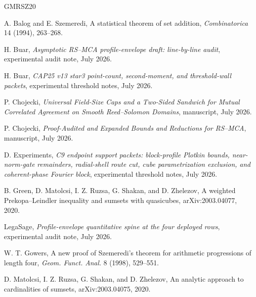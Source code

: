 \documentclass[11pt,a4paper]{amsart}
\numberwithin{equation}{section}
\theoremstyle{remark}
\begin{document}
\enlargethispage{4\baselineskip}
\begin{thebibliography}{GMRSZ20}

A. Balog and E. Szemeredi,
\newblock A statistical theorem of set addition,
\newblock \emph{Combinatorica} 14 (1994), 263--268.

H. Buar,
\newblock \emph{Asymptotic RS--MCA profile-envelope draft:
line-by-line audit},
\newblock experimental audit note, July 2026.

H. Buar,
\newblock \emph{CAP25 v13 star3 point-count, second-moment, and
threshold-wall packets},
\newblock experimental threshold notes, July 2026.

P. Chojecki,
\newblock \emph{Universal Field-Size Caps and a Two-Sided Sandwich for
Mutual Correlated Agreement on Smooth Reed--Solomon Domains},
\newblock manuscript, July 2026.

P. Chojecki,
\newblock \emph{Proof-Audited and Expanded Bounds and Reductions for
RS--MCA},
\newblock manuscript, July 2026.

D. Experiments,
\newblock \emph{C9 endpoint support packets: block-profile Plotkin bounds,
near-norm-gate remainders, radial-shell route cut, cube parametrization
exclusion, and coherent-phase Fourier block},
\newblock experimental threshold notes, July 2026.

B. Green, D. Matolcsi, I. Z. Ruzsa, G. Shakan, and D. Zhelezov,
\newblock A weighted Prekopa--Leindler inequality and sumsets with quasicubes,
\newblock arXiv:2003.04077, 2020.

LegaSage,
\newblock \emph{Profile-envelope quantitative spine at the four deployed
rows},
\newblock experimental audit note, July 2026.

W. T. Gowers,
\newblock A new proof of Szemeredi's theorem for arithmetic progressions of length four,
\newblock \emph{Geom. Funct. Anal.} 8 (1998), 529--551.

D. Matolcsi, I. Z. Ruzsa, G. Shakan, and D. Zhelezov,
\newblock An analytic approach to cardinalities of sumsets,
\newblock arXiv:2003.04075, 2020.

\end{thebibliography}
\end{document}
